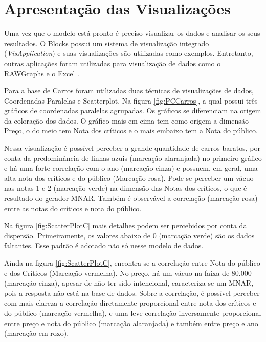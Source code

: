 \documentclass[
	12pt,				%
	openright,			%
	oneside,			%
	a4paper,			%
	english,			%
	brazil				%
	]{abntex2}
\begin{document}
		
	\section{Apresentação das Visualizações}
	Uma vez que o modelo está pronto é preciso visualizar os dados e analisar os seus resultados.
	O Blocks possui um sistema de visualização integrado (\emph{VisApplication}) e suas visualizações são utilizadas como exemplos.
	Entretanto, outras aplicações foram utilizadas para visualização de dados como o RAWGraphs \cite{rawGraphs} e o Excel \cite{excel}.
	\par

	Para a base de Carros foram utilizadas duas técnicas de visualizações de dados, Coordenadas Paralelas e Scatterplot.
	Na figura \ref{fig:PCCarros}, a qual possui três gráficos de coordenadas paralelas agrupadas.
	Os gráficos se diferenciam na origem da coloração dos dados.
	O gráfico mais em cima tem como origem a dimensão Preço, o do meio tem Nota dos críticos e o mais embaixo tem a Nota do público.
	\par
	Nessa visualização é possível perceber a grande quantidade de carros baratos, por conta da predominância de linhas azuis (marcação alaranjada) no primeiro gráfico e há uma forte correlação com o ano (marcação cinza) e possuem, em geral, uma alta nota dos críticos e do público (Marcação rosa).
	Pode-se perceber um vácuo nas notas 1 e 2 (marcação verde) na dimensão das Notas dos críticos, o que é resultado do gerador MNAR.
	Também é observável a correlação (marcação rosa) entre as notas do críticos e nota do público.
	\par
	Na figura \ref{fig:ScatterPlotC} mais detalhes podem ser percebidos por conta da dispersão.
	Primeiramente, os valores abaixo de 0 (marcação verde) são os dados faltantes.
	Esse padrão é adotado não só nesse modelo de dados.
	\par
	Ainda na figura \ref{fig:ScatterPlotC}, encontra-se a correlação entre Nota do público e dos Críticos (Marcação vermelha).
	No preço, há um vácuo na faixa de 80.000 (marcação cinza), apesar de não ter sido intencional, caracteriza-se um MNAR, pois a resposta não está na base de dados.
	Sobre a correlação, é possível perceber com mais clareza a correlação diretamente proporcional entre nota dos críticos e do público (marcação vermelha), e uma leve correlação inversamente proporcional entre preço e nota do público (marcação alaranjada) e também entre preço e ano (marcação em roxo).
	\par
\end{document}
